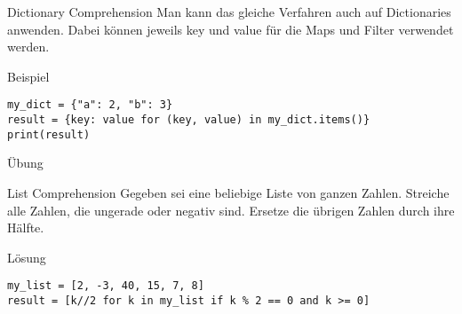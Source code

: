 \begin{fragile}

\begin{block}{Dictionary Comprehension}
\vspace{2pt}
Man kann das gleiche Verfahren auch auf Dictionaries anwenden. Dabei können jeweils key und value für die Maps und Filter verwendet werden. 
\end{block}

\vspace{12pt}

\begin{exampleblock}{Beispiel}
\vspace{2pt}
\begin{verbatim}
my_dict = {"a": 2, "b": 3}
result = {key: value for (key, value) in my_dict.items()}
print(result)
\end{verbatim}
\end{exampleblock}

\end{fragile}

\begin{fragile}{Übung}

\begin{block}{List Comprehension}
\vspace{2pt}
Gegeben sei eine beliebige Liste von ganzen Zahlen. Streiche alle Zahlen, die ungerade oder negativ sind. Ersetze die übrigen Zahlen durch ihre Hälfte. 
\end{block}


\vspace{12pt}

\begin{solutionblock}{Lösung}
\begin{verbatim}
my_list = [2, -3, 40, 15, 7, 8]
result = [k//2 for k in my_list if k % 2 == 0 and k >= 0]
\end{verbatim}
\end{solutionblock}

\end{fragile}


